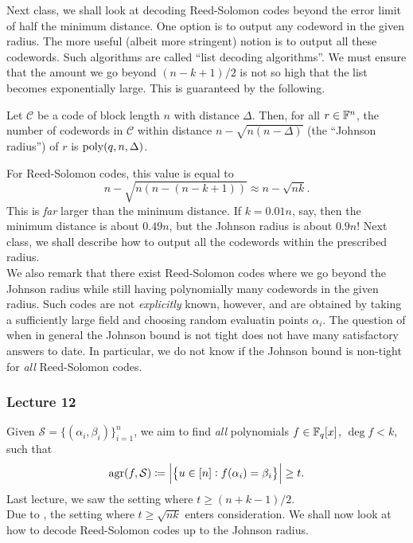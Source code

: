 		Next class, we shall look at decoding Reed-Solomon codes beyond the error limit of half the minimum distance. One option is to output any codeword in the given radius. The more useful (albeit more stringent) notion is to output all these codewords. Such algorithms are called ``list decoding algorithms''.
		We must ensure that the amount we go beyond $(n-k+1)/2$ is not so high that the list becomes exponentially large. This is guaranteed by the following.

		\begin{ftheo}[Johnson]
			\label{johnson bound}
			Let $\mathcal{C}$ be a code of block length $n$ with distance $\Delta$. Then, for all $r \in \mathbb{F}^n$, the number of codewords in $\mathcal{C}$ within distance $n - \sqrt{n(n-\Delta)}$ (the ``Johnson radius'') of $r$ is $\operatorname{poly}(q,n,\Delta)$.
		\end{ftheo}

		For Reed-Solomon codes, this value is equal to
		\[ n - \sqrt{n\left( n - (n-k+1) \right)} \approx n-\sqrt{nk}. \]
		This is \emph{far} larger than the minimum distance. If $k = 0.01n$, say, then the minimum distance is about $0.49n$, but the Johnson radius is about $0.9n$! Next class, we shall describe how to output all the codewords within the prescribed radius.\\
		We also remark that there exist Reed-Solomon codes where we go beyond the Johnson radius while still having polynomially many codewords in the given radius. Such codes are not \emph{explicitly} known, however, and are obtained by taking a sufficiently large field and choosing random evaluatin points $\alpha_i$. %
		The question of when in general the Johnson bound is not tight does not have many satisfactory answers to date. In particular, we do not know if the Johnson bound is non-tight for \emph{all} Reed-Solomon codes.

	\subsubsection{Lecture 12}

		Given $\mathcal{S} = \{(\alpha_i,\beta_i)\}_{i=1}^n$, we aim to find \emph{all} polynomials $f \in \mathbb{F}_q[x]$, $\deg f < k$, such that
		\[ \operatorname{agr}(f,\mathcal{S}) \coloneqq \left|\left\{ u \in [n] : f(\alpha_i) = \beta_i \right\}\right| \ge t. \]
		Last lecture, we saw the setting where $t \ge (n+k-1)/2$.\\
		Due to , the setting where $t \ge \sqrt{nk}$ enters consideration. We shall now look at how to decode Reed-Solomon codes up to the Johnson radius. \\ %

